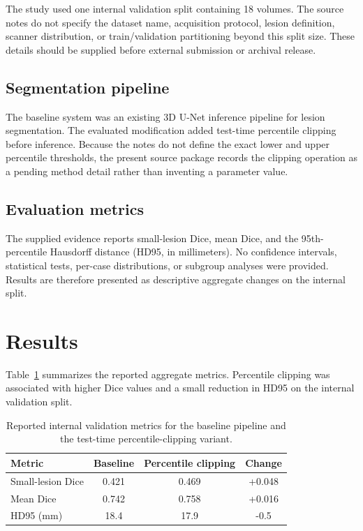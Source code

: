 \documentclass[11pt]{article}
\begin{document}
The study used one internal validation split containing 18 volumes. The source notes do not specify the dataset name, acquisition protocol, lesion definition, scanner distribution, or train/validation partitioning beyond this split size. These details should be supplied before external submission or archival release.

\subsection{Segmentation pipeline}

The baseline system was an existing 3D U-Net inference pipeline for lesion segmentation. The evaluated modification added test-time percentile clipping before inference. Because the notes do not define the exact lower and upper percentile thresholds, the present source package records the clipping operation as a pending method detail rather than inventing a parameter value.

\subsection{Evaluation metrics}

The supplied evidence reports small-lesion Dice, mean Dice, and the 95th-percentile Hausdorff distance (HD95, in millimeters). No confidence intervals, statistical tests, per-case distributions, or subgroup analyses were provided. Results are therefore presented as descriptive aggregate changes on the internal split.

\section{Results}

Table~\ref{tab:metrics} summarizes the reported aggregate metrics. Percentile clipping was associated with higher Dice values and a small reduction in HD95 on the internal validation split.

\begin{table}[htbp]
\centering
\caption{Reported internal validation metrics for the baseline pipeline and the test-time percentile-clipping variant.}
\label{tab:metrics}
\begin{tabular}{lccc}
\toprule
Metric & Baseline & Percentile clipping & Change \\
\midrule
Small-lesion Dice & 0.421 & 0.469 & +0.048 \\
Mean Dice & 0.742 & 0.758 & +0.016 \\
HD95 (mm) & 18.4 & 17.9 & -0.5 \\
\bottomrule
\end{tabular}
\end{table}
\end{document}

